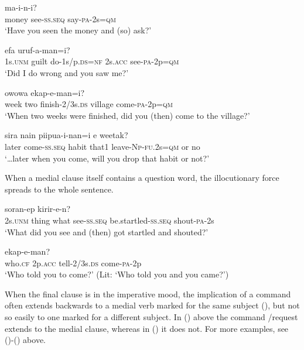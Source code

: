 \ea%
\label{ex:x1899}
  ma-i-n-i? \\
money  see-\textsc{ss}.\textsc{seq}  say-\textsc{pa}-2s=\textsc{qm}\\
\glt `Have you seen the money and (so) ask?'
\z

\ea%
\label{ex:x1900}
\gll [Yo  pina  on-amkun=ko]  efa  uruf-a-man=i?\\
1s.\textsc{unm}  guilt  do-1s/p.\textsc{ds}=\textsc{nf}  2s.\textsc{acc}  see-\textsc{pa}-2p=\textsc{qm}\\
\glt `Did I do wrong and you saw me?'
\z

\ea%
\label{ex:x1901}
  owowa  ekap-e-man=i? \\
week  two  finish-2/3s.\textsc{ds}  village  come-\textsc{pa}-2p=\textsc{qm}\\
\glt `When two weeks were finished, did you (then) come to the village?'
\z

\ea%
\label{ex:x1902}
  sira  nain  piipua-i-nan=i  e  weetak? \\
later  come-\textsc{ss}.\textsc{seq}  habit  that1  leave-\textsc{Np}-\textsc{fu}.2s=\textsc{qm}  or  no\\
\glt `{\dots}later when you come, will you drop that habit or not?'
\z


When a medial clause itself contains a question word, the illocutionary force spreads to the whole sentence. 

\ea%
\label{ex:x1363}
  soran-ep  kirir-e-n?\\
2s.\textsc{unm}  thing  what  see-\textsc{ss}.\textsc{seq}  be.startled-\textsc{ss}.\textsc{seq}  shout-\textsc{pa}-2s\\
\glt `What did you see and (then) got startled and shouted?'
\z

\ea%
\label{ex:x1903}
  ekap-e-man? \\
who.\textsc{cf}  2p.\textsc{acc}  tell-2/3s.\textsc{ds}  come-\textsc{pa}-2p\\
\glt `Who told you to come?' (Lit: `Who told you and you came?')
\z


When the final clause is in the imperative mood, the implication of a command often extends backwards to a medial verb marked for the same subject (), but not so easily to one marked for a different subject. In () above the command /request extends to the medial clause, whereas in () it does not. For more examples, see ()-() above.


